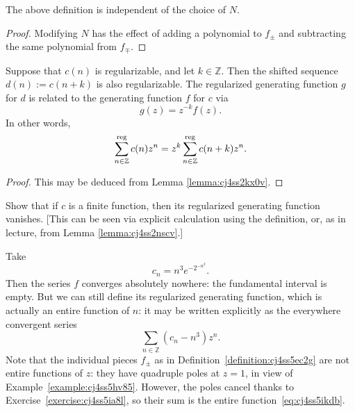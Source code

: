 \documentclass[reqno]{amsart}  \numberwithin{theorem}{section} \numberwithin{equation}{section}
\begin{document}
\begin{lemma}\label{lemma:cj4ss2kx0v}
  The above definition is independent of the choice of $N$.
\end{lemma}
\begin{proof}
  Modifying $N$ has the effect of adding a polynomial to $f_{\pm}$ and subtracting the same polynomial from $f_{\mp}$.
\end{proof}
\begin{lemma}\label{lemma:cj4ss2nscv}
  Suppose that $c(n)$ is regularizable, and let $k \in \mathbb{Z}$.  Then the shifted sequence $d(n) := c(n+k)$ is also regularizable.  The regularized generating function $g$ for $d$ is related to the generating function $f$ for $c$ via
  \begin{equation*}
    g(z) = z^{-k} f(z).
  \end{equation*}
  In other words,
  \begin{equation*}
    \sum_{n \in \mathbb{Z}}^{\operatorname{reg}} c(n) z^n
    = 
    z^k \sum_{n \in \mathbb{Z}}^{\operatorname{reg}} c(n+k) z^n.
  \end{equation*}
\end{lemma}
\begin{proof}
  This may be deduced from Lemma \ref{lemma:cj4ss2kx0v}.
\end{proof}
\begin{exercise}\label{exercise:cj4ss5ia8l}
  Show that if $c$ is a finite function, then its regularized generating function vanishes.  [This can be seen via explicit calculation using the definition, or, as in lecture, from Lemma \ref{lemma:cj4ss2nscv}.]
\end{exercise}

\begin{example}
  Take
  \begin{equation*}
    c_n = n^3 e^{- 2^{- n^2 }}.
  \end{equation*}
  Then the series $f$ converges absolutely nowhere: the fundamental interval is empty.  But we can still define its regularized generating function, which is actually an entire function of $n$: it may be written explicitly as the everywhere convergent series
  \begin{equation}\label{eq:cj4ss5ikdb}
\sum_{n \in \mathbb{Z} } (c_n - n^3) z^n.
\end{equation}
Note that the individual pieces $f_{\pm}$ as in Definition~\ref{definition:cj4ss5ec2g} are not entire functions of $z$: they have quadruple poles at $z=1$, in view of Example~\ref{example:cj4ss5hv85}.  However, the poles cancel thanks to Exercise~\ref{exercise:cj4ss5ia8l}, so their sum is the entire function~\eqref{eq:cj4ss5ikdb}.
\end{example}
\end{document}
